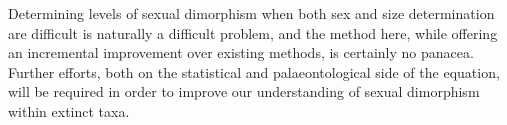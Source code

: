 \documentclass[letterpaper]{article}
\begin{document}
Determining levels of sexual dimorphism when both sex and size determination are difficult is naturally a difficult problem, and the method here, while offering an incremental improvement over existing methods, is certainly no panacea. Further efforts, both on the statistical and palaeontological side of the equation, will be required in order to improve our understanding of sexual dimorphism within extinct taxa.

\printbibliography[title=Bibliography]
\end{document}
